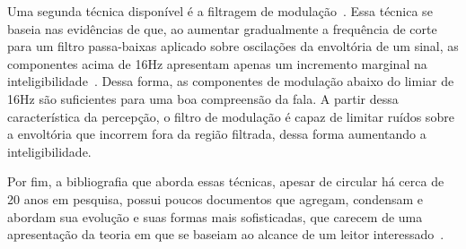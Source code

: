 Uma segunda técnica disponível é a filtragem de modulação~\cite{atlas2005}. Essa
técnica se baseia nas evidências de que, ao aumentar gradualmente a frequência
de corte para um filtro passa-baixas aplicado sobre oscilações da envoltória de
um sinal, as componentes acima de 16Hz apresentam apenas um incremento marginal
na inteligibilidade~\cite{drullman1994}. Dessa forma, as componentes de
modulação abaixo do limiar de 16Hz são suficientes para uma boa compreensão da
fala. A partir dessa característica da percepção, o filtro de modulação é capaz
de limitar ruídos sobre a envoltória que incorrem fora da região filtrada, dessa
forma aumentando a inteligibilidade.


Por fim, a bibliografia que aborda essas técnicas, apesar de circular há cerca
de 20 anos em pesquisa, possui poucos documentos que agregam, condensam e
abordam sua evolução e suas formas mais sofisticadas, que carecem de uma
apresentação da teoria em que se baseiam ao alcance de um leitor
interessado~\cite{parchami2016,paliwal2015}.

\vspace{0.4cm}